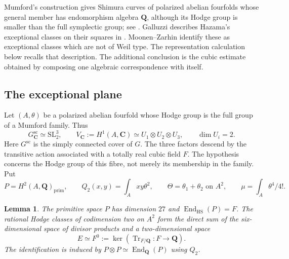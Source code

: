 \documentclass[11pt]{article}
\newtheorem{lemma}[theorem]{Lemma}
\theoremstyle{definition}
\theoremstyle{remark}
\newcommand{\Q}{\mathbf Q}
\newcommand{\C}{\mathbf C}
\begin{document}
Mumford's construction gives Shimura curves of polarized abelian
fourfolds whose general member has endomorphism algebra $\Q$, although
its Hodge group is smaller than the full symplectic group; see
\cite[\S1.1]{Noot}. Galluzzi describes Hazama's exceptional classes on
their squares in \cite[Introduction, p.~727;
Propositions~4.1--4.2, pp.~733--734]{Galluzzi}.
Moonen--Zarhin \cite[Theorem~0.1(iii), p.~2]{MoonenZarhin}
identify these as exceptional classes which are not of Weil type.
The representation calculation below recalls that description. The
additional conclusion is the cubic estimate obtained by composing one
algebraic correspondence with itself.

\subsection{The exceptional plane}

Let $(A,\theta)$ be a polarized abelian fourfold whose Hodge group is the
full group of a Mumford family. Thus
\[
 G^{\mathrm{sc}}_{\C}\simeq\mathrm{SL}_2^3,\qquad
 V_{\C}:=H^1(A,\C)\simeq U_1\otimes U_2\otimes U_3,
 \qquad \dim U_i=2.
\]
Here $G^{\mathrm{sc}}$ is the simply connected cover of $G$.
The three factors descend by the transitive action associated with a
totally real cubic field $F$. The hypothesis concerns the Hodge group
of this fibre, not merely its membership in the family. Put
\[
 P=H^2(A,\Q)_{\mathrm{prim}},\qquad
 Q_2(x,y)=\int_Axy\theta^2,\qquad
 \Theta=\theta_1+\theta_2\text{ on }A^2,\qquad
 \mu=\int_A\theta^4/4!.
\]

\begin{lemma}\label{lem:mumford-plane}
The primitive space $P$ has dimension $27$ and
$\operatorname{End}_{\mathrm{HS}}(P)=F$. The rational Hodge classes
of codimension two on $A^2$ form the direct sum of the six-dimensional
space of divisor products and a two-dimensional space
\[
 E\simeq F^0:=\ker(\operatorname{Tr}_{F/\Q}:F\longrightarrow\Q).
\]
The identification is induced by
$P\otimes P\simeq\operatorname{End}_{\Q}(P)$ using $Q_2$.
\end{lemma}
\end{document}
